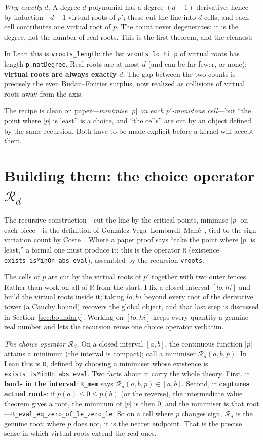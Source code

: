 \documentclass[11pt]{article}
\newcommand{\lean}[1]{\texttt{#1}}
\newcommand{\R}{\mathbb{R}}
\newcommand{\Rd}{\mathcal{R}}
\newcommand{\keyeq}[1]{\begin{center}\keybox{$\displaystyle #1$}\end{center}}
\begin{document}
\emph{Why exactly $d$.} A degree-$d$ polynomial has a degree-$(d-1)$ derivative, hence---by
induction---$d-1$ virtual roots of $p'$; these cut the line into $d$ cells, and each cell contributes
one virtual root of $p$. The count never degenerates: it is the degree, not the number of real roots.
This is the first theorem, and the cleanest:
\keyeq{\#\,\{\text{virtual roots of }p\} \;=\; \deg p .}
In Lean this is \lean{vroots\_length}: the list \lean{vroots lo hi p} of virtual roots has length
\lean{p.natDegree}. Real roots are at most $d$ (and can be far fewer, or none); \textbf{virtual roots
are always exactly $d$}. The gap between the two counts is precisely the even Budan--Fourier surplus,
now realized as collisions of virtual roots away from the axis.

The recipe is clean on paper---\emph{minimise $|p|$ on each $p'$-monotone cell}---but ``the point
where $|p|$ is least'' is a choice, and ``the cells'' are cut by an object defined by the same
recursion. Both have to be made explicit before a kernel will accept them.

\section{Building them: the choice operator \texorpdfstring{$\Rd_d$}{R\_d}}\label{sec:q2}

The recursive construction---cut the line by the critical points, minimise $|p|$ on each piece---is the
definition of Gonz\'alez-Vega--Lombardi--Mah\'e~\cite{glm}, tied to the sign-variation count by
Coste~\cite{coste}. Where a paper proof says ``take the point where $|p|$ is least,'' a formal one must
produce it: this is the operator \lean{R} (existence \lean{exists\_isMinOn\_abs\_eval}), assembled by
the recursion \lean{vroots}.

The cells of $p$ are cut by the virtual roots of $p'$ together with
two outer fences. Rather than work on all of $\R$ from the start, I fix a closed interval $[lo,hi]$
and build the virtual roots inside it; taking $lo,hi$ beyond every root of the derivative tower (a
Cauchy bound) recovers the global object, and that last step is discussed in
Section~\ref{sec:boundary}. Working on $[lo,hi]$ keeps every quantity a genuine real number and lets
the recursion reuse one choice operator verbatim.

\emph{The choice operator $\Rd_d$.} On a closed interval $[a,b]$, the continuous function $|p|$
attains a minimum (the interval is compact); call a minimiser $\Rd_d(a,b,p)$. In Lean this is
\lean{R}, defined by choosing a minimiser whose existence is \lean{exists\_isMinOn\_abs\_eval}. Two
facts about it carry the whole theory. First, it \textbf{lands in the interval}: \lean{R\_mem} says
$\Rd_d(a,b,p)\in[a,b]$. Second, it \textbf{captures actual roots}: if $p(a)\le 0\le p(b)$ (or the
reverse), the intermediate value theorem gives a root, the minimum of $|p|$ is then $0$, and the
minimiser is that root---\lean{R\_eval\_eq\_zero\_of\_le\_zero\_le}. So on a cell where $p$ changes
sign, $\Rd_d$ is the genuine root; where $p$ does not, it is the nearer endpoint. That is the precise
sense in which virtual roots extend the real ones.
\end{document}
